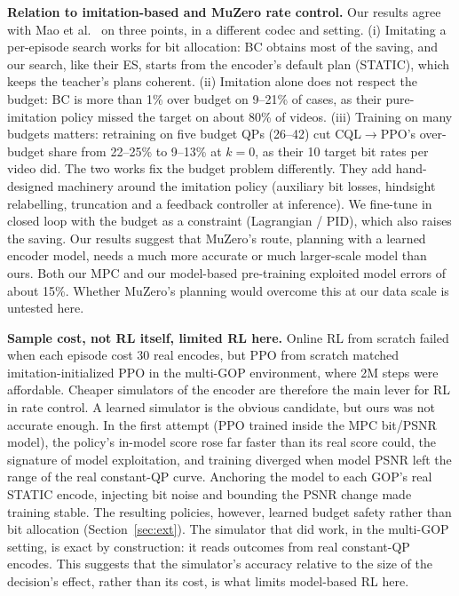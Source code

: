 \documentclass[conference]{IEEEtran}
\newcommand{\cqlppo}{CQL$\to$PPO}
\begin{document}
\textbf{Relation to imitation-based and MuZero rate control.} Our results agree with Mao et al.~\cite{mao2020neural} on three points, in a different codec and setting. (i) Imitating a per-episode search works for bit allocation: BC obtains most of the saving, and our search, like their ES, starts from the encoder's default plan (STATIC), which keeps the teacher's plans coherent. (ii) Imitation alone does not respect the budget: BC is more than 1\% over budget on 9--21\% of cases, as their pure-imitation policy missed the target on about 80\% of videos. (iii) Training on many budgets matters: retraining on five budget QPs (26--42) cut \cqlppo{}'s over-budget share from 22--25\% to 9--13\% at $k{=}0$, as their 10 target bit rates per video did. The two works fix the budget problem differently. They add hand-designed machinery around the imitation policy (auxiliary bit losses, hindsight relabelling, truncation and a feedback controller at inference). We fine-tune in closed loop with the budget as a constraint (Lagrangian / PID), which also raises the saving. Our results suggest that MuZero's route, planning with a learned encoder model, needs a much more accurate or much larger-scale model than ours. Both our MPC and our model-based pre-training exploited model errors of about 15\%. Whether MuZero's planning would overcome this at our data scale is untested here.

\textbf{Sample cost, not RL itself, limited RL here.} Online RL from scratch failed when each episode cost 30 real encodes, but PPO from scratch matched imitation-initialized PPO in the multi-GOP environment, where 2M steps were affordable. Cheaper simulators of the encoder are therefore the main lever for RL in rate control. A learned simulator is the obvious candidate, but ours was not accurate enough. In the first attempt (PPO trained inside the MPC bit/PSNR model), the policy's in-model score rose far faster than its real score could, the signature of model exploitation, and training diverged when model PSNR left the range of the real constant-QP curve. Anchoring the model to each GOP's real STATIC encode, injecting bit noise and bounding the PSNR change made training stable. The resulting policies, however, learned budget safety rather than bit allocation (Section~\ref{sec:ext}). The simulator that did work, in the multi-GOP setting, is exact by construction: it reads outcomes from real constant-QP encodes. This suggests that the simulator's accuracy relative to the size of the decision's effect, rather than its cost, is what limits model-based RL here.
\end{document}
